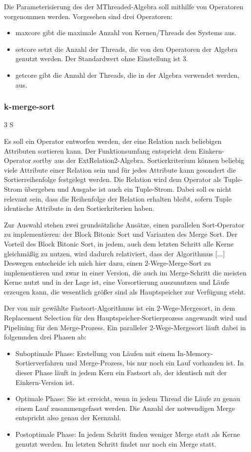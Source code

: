 \documentclass[a4paper,12pt,twoside]{article}
\begin{document}
Die Parameterisierung des der MThreaded-Algebra soll mithilfe von Operatoren vorgenommen werden. Vorgesehen sind drei Operatoren:

\begin{itemize}
	\item maxcore gibt die maximale Anzahl von Kernen/Threads des Systems aus.
	\item setcore setzt die Anzahl der Threads, die von den Operatoren der Algebra genutzt werden. Der Standardwert ohne Einstellung ist 3.
	\item getcore gibt die Anzahl der Threads, die in der Algebra verwendet werden, aus.
\end{itemize}

\subsubsection{k-merge-sort} 3 S

Es soll ein Operator entworfen werden, der eine Relation nach beliebigen Attributen sortieren kann. Der Funktionsumfang entspricht dem Einkern-Operator sortby aus der ExtRelation2-Algebra. Sortierkriterium können beliebig viele Attribute einer Relation sein und für jedes Attribute kann gesondert die Sortierreihenfolge festgelegt werden. Die Relation wird dem Operator als Tuple-Strom übergeben und Ausgabe ist auch ein Tuple-Strom. Dabei soll es nicht relevant sein, dass die Reihenfolge der Relation erhalten bleibt, sofern Tuple identische Attribute in den Sortierkriterien haben.

Zur Auswahl stehen zwei grundsätzliche Ansätze, einen parallelen Sort-Operator zu implementieren: der Block Bitonic Sort und Varianten des Merge Sort. Der Vorteil des Block Bitonic Sort, in jedem, auch dem letzten Schritt alle Kerne gleichmäßig zu nutzen, wird dadurch relativiert, dass der Algorithmus [...] Deswegen entscheide ich mich hier dazu, einen 2-Wege-Merge-Sort zu implementieren und zwar in einer Version, die auch im Merge-Schritt die meisten Kerne nutzt und in der Lage ist, eine Vorsortierung auszunutzen und Läufe erzeugen kann, die wesentlich größer sind als Hauptspeicher zur Verfügung steht.

Der von mir gewählte Fastsort-Algorithmus ist ein 2-Wege-Mergesort, in dem Replacement Selection für den Hauptspeicher-Sortierprozess angewandt wird und Pipelining für den Merge-Prozess. Ein paralleler 2-Wege-Mergesort läuft dabei in folgemnden drei Phasen ab:

\begin{itemize}
	\item Suboptimale Phase: Erstellung von Läufen mit einem In-Memory-Sortierverfahren und Merge-Prozess, bis nur noch ein Lauf vorhanden ist. In dieser Phase läuft in jedem Kern ein Fastsort ab, der identisch mit der Einkern-Version ist.
	\item Optimale Phase: Sie ist erreicht, wenn in jedem Thread die Läufe zu genau einem Lauf zusammengefasst werden. Die Anzahl der notwendigen Merge entspricht also genau der Kernzahl. 
	\item Postoptimale Phase: In jedem Schritt finden weniger Merge statt als Kerne genutzt werden. Im letzten Schritt findet nur noch ein Merge statt.
\end{itemize}
\end{document}
